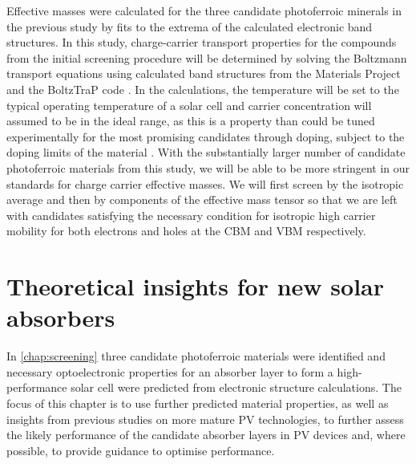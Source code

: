 \documentclass[11pt, twoside]{report}
\begin{document}
Effective masses were calculated for the three candidate photoferroic minerals in the previous study by fits to the extrema of the calculated electronic band structures. In this study, charge-carrier transport properties for the compounds from the initial screening procedure will be determined by solving the Boltzmann transport equations using calculated band structures from the Materials Project and the BoltzTraP code \cite{Boltztrap}. In the calculations, the temperature will be set to the typical operating temperature of a solar cell and carrier concentration will assumed to be in the ideal range, as this is a property than could be tuned experimentally for the most promising candidates through doping, subject to the doping limits of the material \cite{Zhang_doping_limits}. 
With the substantially larger number of candidate photoferroic materials from this study, we will be able to be more stringent in our standards for charge carrier effective masses. We will first screen by the isotropic average and then by components of the effective mass tensor so that we are left with candidates satisfying the necessary condition for isotropic high carrier mobility for both electrons and holes at the CBM and VBM respectively.



\chapter{Theoretical insights for new solar absorbers}\label{chap:insights}

In \autoref{chap:screening} three candidate photoferroic materials were identified and necessary optoelectronic properties for an absorber layer to form a high-performance solar cell were predicted from electronic structure calculations. The focus of this chapter is to use further predicted material properties, as well as insights from previous studies on more mature PV technologies, to further assess the likely performance of the candidate absorber layers in PV devices and, where possible, to provide guidance to optimise performance.
\end{document}
